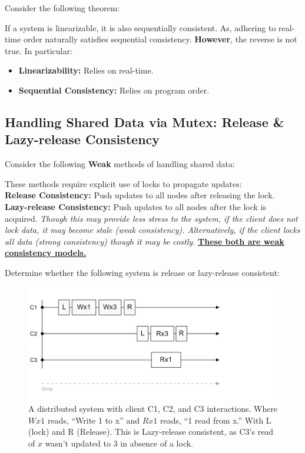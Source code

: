 \noindent
Consider the following theorem:
\begin{theo}
    
    If a system is linearizable, it is also sequentially consistent. As,  adhering to real-time order naturally satisfies sequential consistency.
    \textbf{However}, the reverse is not true. In particular:
    \begin{itemize}
        \item \textbf{Linearizability:} Relies on real-time.
        \item \textbf{Sequential Consistency:} Relies on program order.
    \end{itemize}
\end{theo}

\subsection{Handling Shared Data via Mutex: Release \& Lazy-release Consistency}
\label{sec:rel}

\noindent
Consider the following \textbf{Weak} methods of handling shared data:
\begin{Def}
    
    These methods require explicit use of locks to propagate updates:\\
    \textbf{Release Consistency:} Push updates to all nodes after releasing the lock.\\
    \textbf{Lazy-release Consistency:} Push updates to all nodes after the lock is acquired.
    \textit{Though this may provide less stress to the system, if the client does not lock data, it may become stale (weak consistency).
    Alternatively, if the client locks all data (strong consistency) though it may be costly. }\underline{\textbf{These both are weak consistency models.}}
\end{Def}

\noindent
Determine whether the following system is release or lazy-release consistent:

\begin{figure}[h]
    \centering
    \includegraphics[width=.9\textwidth]{Sections/consist/rel.png}
    \caption{A distributed system with client C1, C2, and C3 interactions. Where $Wx1$ reads, ``Write 1 to x'' and $Rx1$ reads, ``1 read from x.'' With L (lock) and R (Release). This 
    is Lazy-release consistent, as C3's read of $x$ wasn't updated to 3 in absence of a lock.}
\end{figure}
\newpage 

